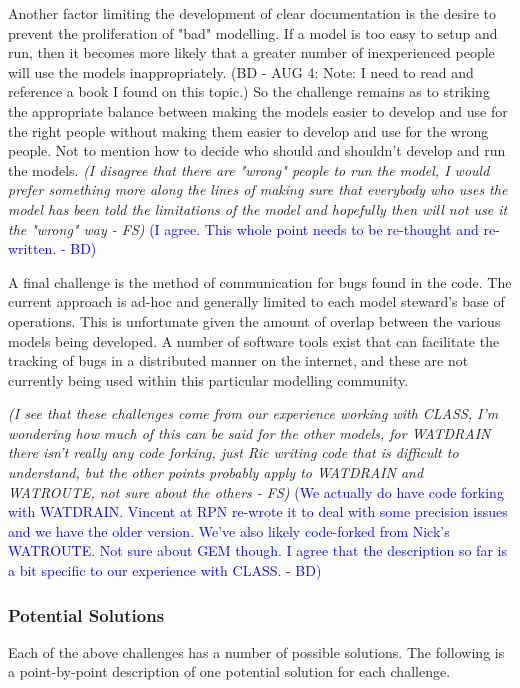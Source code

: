 \documentclass[hess]{copernicus}
\begin{document}
Another factor limiting the development of clear documentation is the desire to prevent the proliferation of "bad" modelling. If a model is too easy to setup and run, then it becomes more likely that a greater number of inexperienced people will use the models inappropriately. (BD - AUG 4: Note: I need to read and reference a book I found on this topic.) So the challenge remains as to striking the appropriate balance between making the models easier to develop and use for the right people without making them easier to develop and use for the wrong people. Not to mention how to decide who should and shouldn't develop and run the models. {\em (I disagree that there are "wrong" people to run the model, I would prefer something more along the lines of making sure that everybody who uses the model has been told the limitations of the model and hopefully then will not use it the "wrong" way - FS)}\textcolor{blue}{ (I agree. This whole point needs to be re-thought and re-written. - BD)}

A final challenge is the method of communication for bugs found in the code. The current approach is ad-hoc and generally limited to each model steward's base of operations. This is unfortunate given the amount of overlap between the various models being developed. A number of software tools exist that can facilitate the tracking of bugs in a distributed manner on the internet, and these are not currently being used within this particular modelling community.

{\em (I see that these challenges come from our experience working with CLASS, I'm wondering how much of this can be said for the other models, for WATDRAIN there isn't really any code forking, just Ric writing code that is difficult to understand, but the other points probably apply to WATDRAIN and WATROUTE, not sure about the others - FS)}\textcolor{blue}{ (We actually do have code forking with WATDRAIN. Vincent at RPN re-wrote it to deal with some precision issues and we have the older version. We've also likely code-forked from Nick's WATROUTE. Not sure about GEM though. I agree that the description so far is a bit specific to our experience with CLASS. - BD)}

\subsubsection{Potential Solutions}
Each of the above challenges has a number of possible solutions. The following is a point-by-point description of one potential solution for each challenge.
\end{document}
